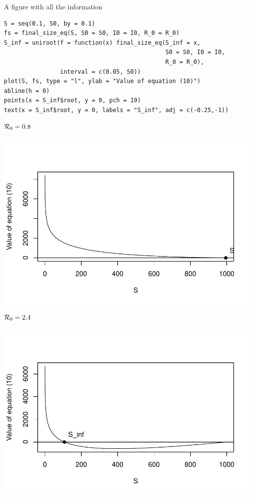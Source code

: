 \documentclass[aspectratio=169]{beamer}\usepackage[]{graphicx}\usepackage[]{xcolor}
\begin{document}
\begin{frame}[fragile]{A figure with all the information}
\begin{lstlisting}
S = seq(0.1, S0, by = 0.1)
fs = final_size_eq(S, S0 = S0, I0 = I0, R_0 = R_0)
S_inf = uniroot(f = function(x) final_size_eq(S_inf = x, 
                                              S0 = S0, I0 = I0, 
                                              R_0 = R_0),
                interval = c(0.05, S0))
plot(S, fs, type = "l", ylab = "Value of equation (10)")
abline(h = 0)
points(x = S_inf$root, y = 0, pch = 19)
text(x = S_inf$root, y = 0, labels = "S_inf", adj = c(-0.25,-1))
\end{lstlisting}
\end{frame}




\begin{frame}{$\mathcal{R}_0=0.8$}
\begin{center}
  \includegraphics[width=\textwidth]{FIGS/course-01-KMK_final_size_0p8-1.pdf}
\end{center}
\end{frame}





\begin{frame}{$\mathcal{R}_0=2.4$}
  \begin{center}
    \includegraphics[width=\textwidth]{FIGS/course-01-KMK_final_size_2p5-1.pdf}
  \end{center}
\end{frame}
\end{document}

